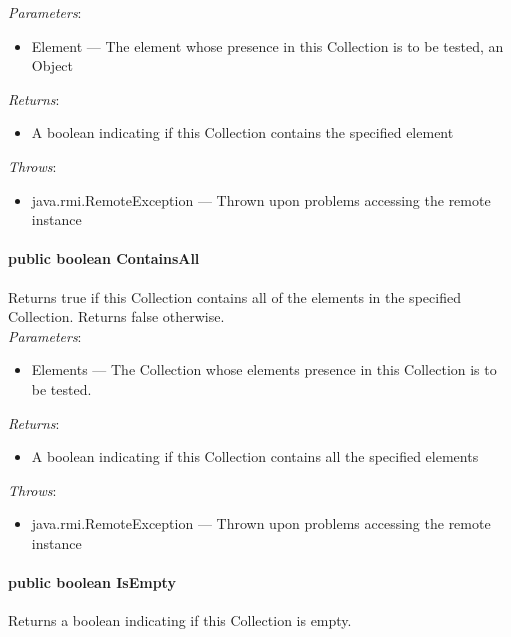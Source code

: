 \documentclass[$Date: 2003/06/26 19:29:31 $]{glabarticle}
\begin{document}
\textit{Parameters}:
\begin{itemize}
\item[] Element --- The element whose presence in this Collection is to be tested, an Object
\end{itemize}

\textit{Returns}:
\begin{itemize}
\item[] A boolean indicating if this Collection contains the specified element
\end{itemize}

 \textit{Throws}:
 \begin{itemize}
 \item[] java.rmi.RemoteException --- Thrown upon problems accessing the remote instance 
 \end{itemize}

\paragraph{public boolean ContainsAll}

Returns true if this Collection contains all of the elements in the
specified Collection. Returns false otherwise.\\

\textit{Parameters}:
\begin{itemize}
\item[] Elements --- The Collection whose elements presence in this Collection is to be tested. 
\end{itemize}

\textit{Returns}:
\begin{itemize}
\item[] A boolean indicating if this Collection contains all the specified elements
\end{itemize}

 \textit{Throws}:
 \begin{itemize}
 \item[] java.rmi.RemoteException --- Thrown upon problems accessing the remote instance 
 \end{itemize}

\paragraph{public boolean IsEmpty}

Returns a boolean indicating if this Collection is empty.\\
\end{document}
